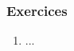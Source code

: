 \documentclass{KodeBook}
\begin{document}


\subsubsection*{Exercices}

\begin{enumerate}
	\item ...
	
\end{enumerate}

%



\ifx\wholebook\relax\else
% 
% 
	
\end{document}
